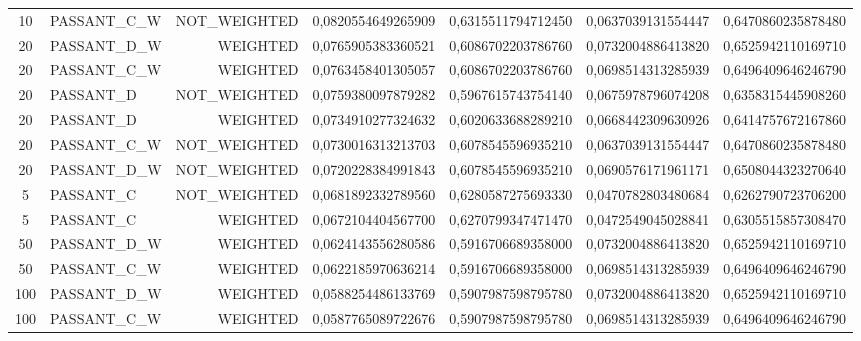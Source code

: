 \begin{table}[H]
{\begin{tabular}{ c l r c c c c }
				10 & PASSANT\_C\_W & NOT\_WEIGHTED & 0,0820554649265909 & 0,6315511794712450 & 0,0637039131554447 & 0,6470860235878480 \\
				
				20 & PASSANT\_D\_W &   WEIGHTED & 0,0765905383360521 & 0,6086702203786760 & 0,0732004886413820 & 0,6525942110169710 \\
				
				20 & PASSANT\_C\_W &   WEIGHTED & 0,0763458401305057 & 0,6086702203786760 & 0,0698514313285939 & 0,6496409646246790 \\
				
				20 &  PASSANT\_D & NOT\_WEIGHTED & 0,0759380097879282 & 0,5967615743754140 & 0,0675978796074208 & 0,6358315445908260 \\
				
				20 &  PASSANT\_D &   WEIGHTED & 0,0734910277324632 & 0,6020633688289210 & 0,0668442309630926 & 0,6414757672167860 \\
				
				20 & PASSANT\_C\_W & NOT\_WEIGHTED & 0,0730016313213703 & 0,6078545596935210 & 0,0637039131554447 & 0,6470860235878480 \\
				
				20 & PASSANT\_D\_W & NOT\_WEIGHTED & 0,0720228384991843 & 0,6078545596935210 & 0,0690576171961171 & 0,6508044323270640 \\
				
				5 &  PASSANT\_C & NOT\_WEIGHTED & 0,0681892332789560 & 0,6280587275693330 & 0,0470782803480684 & 0,6262790723706200 \\
				
				5 &  PASSANT\_C &   WEIGHTED & 0,0672104404567700 & 0,6270799347471470 & 0,0472549045028841 & 0,6305515857308470 \\
				
				50 & PASSANT\_D\_W &   WEIGHTED & 0,0624143556280586 & 0,5916706689358000 & 0,0732004886413820 & 0,6525942110169710 \\
				
				50 & PASSANT\_C\_W &   WEIGHTED & 0,0622185970636214 & 0,5916706689358000 & 0,0698514313285939 & 0,6496409646246790 \\
				
				100 & PASSANT\_D\_W &   WEIGHTED & 0,0588254486133769 & 0,5907987598795780 & 0,0732004886413820 & 0,6525942110169710 \\
				
				100 & PASSANT\_C\_W &   WEIGHTED & 0,0587765089722676 & 0,5907987598795780 & 0,0698514313285939 & 0,6496409646246790 \\
				

\end{tabular}}
\end{table}

